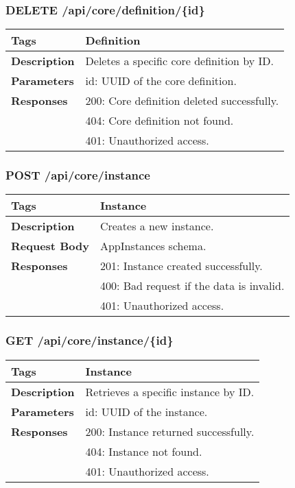 \subsubsection*{DELETE /api/core/definition/\{id\}}
\begin{longtable}{|>{\raggedright\arraybackslash}p{3cm}|p{10cm}|}
\hline
\textbf{Tags} & Definition \\
\hline
\textbf{Description} & Deletes a specific core definition by ID. \\
\hline
\textbf{Parameters} & id: UUID of the core definition. \\
\hline
\textbf{Responses} & 200: Core definition deleted successfully. \\
 & 404: Core definition not found. \\
 & 401: Unauthorized access. \\
\hline
\end{longtable}

\subsubsection*{POST /api/core/instance}
\begin{longtable}{|>{\raggedright\arraybackslash}p{3cm}|p{10cm}|}
\hline
\textbf{Tags} & Instance \\
\hline
\textbf{Description} & Creates a new instance. \\
\hline
\textbf{Request Body} & AppInstances schema. \\
\hline
\textbf{Responses} & 201: Instance created successfully. \\
 & 400: Bad request if the data is invalid. \\
 & 401: Unauthorized access. \\
\hline
\end{longtable}

\subsubsection*{GET /api/core/instance/\{id\}}
\begin{longtable}{|>{\raggedright\arraybackslash}p{3cm}|p{10cm}|}
\hline
\textbf{Tags} & Instance \\
\hline
\textbf{Description} & Retrieves a specific instance by ID. \\
\hline
\textbf{Parameters} & id: UUID of the instance. \\
\hline
\textbf{Responses} & 200: Instance returned successfully. \\
 & 404: Instance not found. \\
 & 401: Unauthorized access. \\
\hline
\end{longtable}


